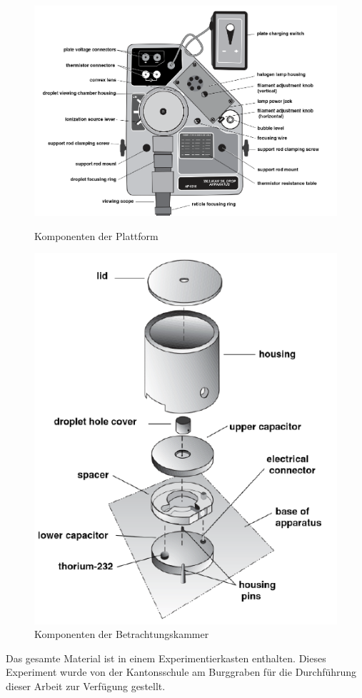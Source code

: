 \begin{figure}[h]
	\centering
	\begin{minipage}[t]{0.45\textwidth}
		\centering
		\includegraphics[scale=0.5]{bilder/pdf/plattformKomponenten.pdf}
		\caption{Komponenten der Plattform \parencite[3]{instructionManualHalogen}}
		\label{fig:plattformKomp}
	\end{minipage}
	\hfill
	\begin{minipage}[t]{0.45\textwidth}
		\centering
		\includegraphics[width=\textwidth]{bilder/pdf/BetrachtungsKammerKomponenten.pdf}
		\caption{Komponenten der Betrachtungskammer \parencite[4]{instructionManualHalogen}}
		\label{fig:betrachtKomp}
	\end{minipage}
\end{figure}

\noindent Das gesamte Material ist in einem Experimentierkasten enthalten. Dieses Experiment wurde von der Kantonsschule am Burggraben für die Durchführung dieser Arbeit zur Verfügung gestellt.





